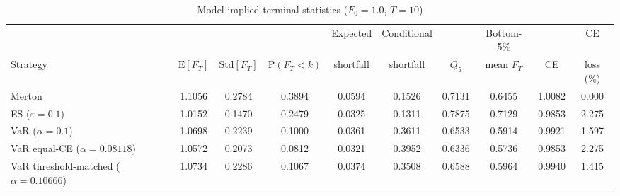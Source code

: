 \begin{table}[htbp]
\centering
\caption{Model-implied terminal statistics ($F_0 = 1.0$, $T = 10$)}
\label{tab:exact_summary}
\begin{tabular}{l ccccccccc}
\toprule
 & & & & Expected & Conditional & & Bottom-5\% & & CE \\
Strategy & $\mathrm{E}[F_T]$ & $\mathrm{Std}[F_T]$ & $\mathrm{P}(F_T<k)$
 & shortfall & shortfall & $Q_{5}$ & mean $F_T$ & CE & loss (\%) \\
\midrule
  Merton & 1.1056 & 0.2784 & 0.3894 & 0.0594 & 0.1526 & 0.7131 & 0.6455 & 1.0082 & 0.000 \\
  ES ($\varepsilon=0.1$) & 1.0152 & 0.1470 & 0.2479 & 0.0325 & 0.1311 & 0.7875 & 0.7129 & 0.9853 & 2.275 \\
  VaR ($\alpha=0.1$) & 1.0698 & 0.2239 & 0.1000 & 0.0361 & 0.3611 & 0.6533 & 0.5914 & 0.9921 & 1.597 \\
  VaR equal-CE ($\alpha=0.08118$) & 1.0572 & 0.2073 & 0.0812 & 0.0321 & 0.3952 & 0.6336 & 0.5736 & 0.9853 & 2.275 \\
  VaR threshold-matched ($\alpha=0.10666$) & 1.0734 & 0.2286 & 0.1067 & 0.0374 & 0.3508 & 0.6588 & 0.5964 & 0.9940 & 1.415 \\
\bottomrule
\end{tabular}
\end{table}
